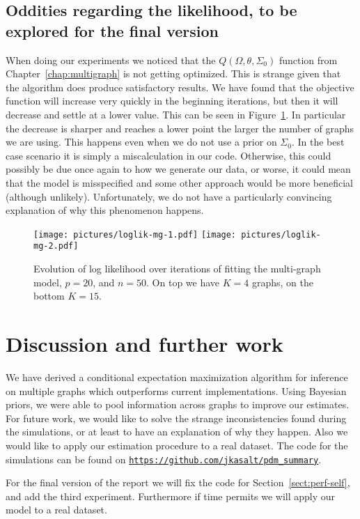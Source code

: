 \documentclass[a4paper, 11pt, oneside]{report}
\newcommand{\1}{\mathds{1}}
\begin{document}
\section{Oddities regarding the likelihood, to be explored for the final version}
When doing our experiments we noticed that the $Q(\Omega, \theta, \Sigma_0)$ function from Chapter~\ref{chap:multigraph}
is not getting optimized. This is strange given that the algorithm does produce satisfactory results.
We have found that the objective function will increase very quickly in the beginning iterations,
but then it will decrease and settle at a lower value. This can be seen in Figure~\ref{fig:loglik-mg-1}.
In particular the decrease is sharper and reaches a lower point the larger the number of graphs we are using.
This happens even when we do not use a prior on $\Sigma_0$.
In the best case scenario it is simply a miscalculation in our code.
Otherwise, this could possibly be due once again to how we generate our data, or worse,
it could mean that the model is misspecified and some other approach would be more beneficial (although unlikely).
Unfortunately, we do not have a particularly convincing explanation of why this phenomenon happens.

\begin{figure}[ht]
	\begin{center}
		\texttt{[image: pictures/loglik-mg-1.pdf]}
		\texttt{[image: pictures/loglik-mg-2.pdf]}
		\hfill
	\end{center}
	\caption{Evolution of log likelihood over iterations of fitting the multi-graph model, $p=20$, and $n=50$. On top we have $K=4$ graphs, on the bottom $K=15$.}
	\label{fig:loglik-mg-1}
\end{figure}


\chapter{Discussion and further work}
We have derived a conditional expectation maximization algorithm for inference on multiple graphs
which outperforms current implementations. Using Bayesian priors, we were able to pool information across
graphs to improve our estimates.
For future work, we would like to solve the strange inconsistencies found during the simulations, or at
least to have an explanation of why they happen.
Also we would like to apply our estimation procedure to a real dataset.
The code for the simulations can be found on
\href{https://github.com/jkasalt/pdm_summary}{\texttt{https://github.com/jkasalt/pdm\_summary}}.

For the final version of the report we will fix the code for Section~\ref{sect:perf-self}, and add the third experiment. Furthermore if time permits we will apply our model to a real dataset.

\cleardoublepage
{}
{}
\printbibliography
\end{document}
